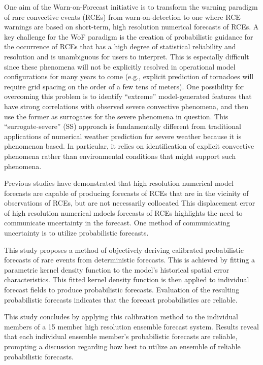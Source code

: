 

One aim of the Warn-on-Forecast initiative is to transform the warning paradigm of rare convective events (RCEs) from warn-on-detection to one where RCE warnings are based on short-term, high resolution numerical forecasts of RCEs.
A key challenge for the WoF paradigm is the creation of probabilistic guidance for the occurrence of RCEs that has a high degree of statistical reliability and resolution and is unambiguous for users to interpret.
This is especially difficult since these phenomena will not be explicitly resolved in operational model configurations for many years to come (e.g., explicit prediction of tornadoes will require grid spacing on the order of a few tens of meters).
One possibility for overcoming this problem is to identify ``extreme'' model-generated features that have strong correlations with observed severe convective phenomena, and then use the former as surrogates for the severe phenomena in question.
This ``surrogate-severe'' (SS) approach is fundamentally different from traditional applications of numerical weather prediction for severe weather because it is phenomenon based.
In particular, it relies on identification of explicit convective phenomena rather than environmental conditions that might support such phenomena.


Previous studies have demonstrated that high resolution numerical model forecasts are capable of producing forecasts of RCEs that are in the vicinity of observations of RCEs, but are not necessarily collocated
This displacement error of high resolution numerical mdoels forecasts of RCEs highlights the need to communicate uncertainty in the forecast.
One method of communicating uncertainty is to utilize probabilistic forecasts.


This study proposes a method of objectively deriving calibrated probabilistic forecasts of rare events from deterministic forecasts.
This is achieved by fitting a parametric kernel density function to the model's historical spatial error characteristics.
This fitted kernel density function is then applied to individual forecast fields to produce probabilistic forecasts.
Evaluation of the resulting probabilistic forecasts indicates that the forecast probabilisties are reliable.


This study concludes by applying this calibration method to the individual members of a 15 member high resolution ensemble forecast system.
Results reveal that each individual ensemble member's probabilistic forecasts are reliable, prompting a discussion regarding how best to utilize an ensemble of reliable probabilistic forecasts.